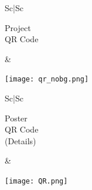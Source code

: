 \documentclass[a1paper,portrait,margin=0.8cm]{baposter}
\begin{document}
\begin{poster}
{\vspace{-0.5em}
\hspace{-1em}
\begin{minipage}[b]{0.4\textwidth}
    
\begin{tabular}{S{c}|S{c}}

\begin{minipage}[t]{0.5\textwidth}
\vspace{-0.1em}
\centering
Project \\ QR Code
\end{minipage}
&
\begin{minipage}[t]{0.48\textwidth}
\vspace{-1em}
\texttt{[image: qr\_nobg.png]}
\end{minipage}

\end{tabular}

\end{minipage}
\hfill
\begin{minipage}[b]{0.5\textwidth}
    
\begin{tabular}{S{c}|S{c}}

\begin{minipage}[t]{0.5\textwidth}
\vspace{-0.1em}
\centering
\hspace{0.4em} Poster \\ 
\hspace{0.4em} QR Code \\
\hspace{0.4em} (Details)
\end{minipage}
&
\begin{minipage}[t]{0.4\textwidth}
\vspace{-1em}
\texttt{[image: QR.png]}
\end{minipage}

\end{tabular}

\end{minipage}
}



\end{poster}
\end{document}
